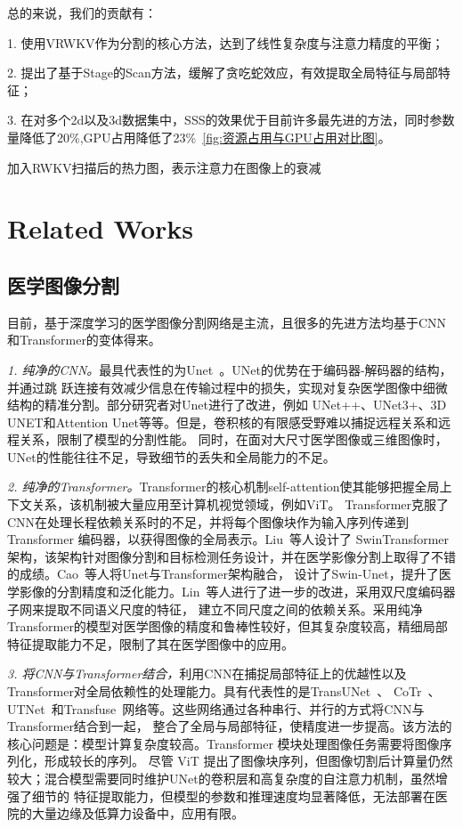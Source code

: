 \documentclass[conference]{IEEEtran}   %
\begin{document}
总的来说，我们的贡献有：

1. 使用VRWKV作为分割的核心方法，达到了线性复杂度与注意力精度的平衡；

2. 提出了基于Stage的Scan方法，缓解了贪吃蛇效应，有效提取全局特征与局部特征；

3. 在对多个2d以及3d数据集中，SSS的效果优于目前许多最先进的方法，同时参数量降低了20\%,GPU占用降低了23\%~\ref{fig:资源占用与GPU占用对比图}。


加入RWKV扫描后的热力图，表示注意力在图像上的衰减



\section{Related Works}
\subsection{医学图像分割}
目前，基于深度学习的医学图像分割网络是主流，且很多的先进方法均基于CNN和Transformer的变体得来。

\textit{1. 纯净的CNN。}最具代表性的为Unet~\cite{Unet}。UNet的优势在于编码器-解码器的结构，并通过跳
跃连接有效减少信息在传输过程中的损失，实现对复杂医学图像中细微结构的精准分割。部分研究者对Unet进行了改进，例如
UNet++、UNet3+、3D UNET和Attention Unet等等。但是，卷积核的有限感受野难以捕捉远程关系和远程关系，限制了模型的分割性能。
同时，在面对大尺寸医学图像或三维图像时，UNet的性能往往不足，导致细节的丢失和全局能力的不足。

\textit{2. 纯净的Transformer。}Transformer的核心机制self-attention使其能够把握全局上下文关系，该机制被大量应用至计算机视觉领域，例如ViT。
Transformer克服了CNN在处理长程依赖关系时的不足，并将每个图像块作为输入序列传递到 Transformer 编码器，以获得图像的全局表示。Liu~\cite{swintransformer}等人设计了
SwinTransformer架构，该架构针对图像分割和目标检测任务设计，并在医学影像分割上取得了不错的成绩。Cao~\cite{swinunet}等人将Unet与Transformer架构融合，
设计了Swin-Unet，提升了医学影像的分割精度和泛化能力。Lin~\cite{dstransunet}等人进行了进一步的改进，采用双尺度编码器子网来提取不同语义尺度的特征，
建立不同尺度之间的依赖关系。采用纯净Transformer的模型对医学图像的精度和鲁棒性较好，但其复杂度较高，精细局部特征提取能力不足，限制了其在医学图像中的应用。


\textit{3. 将CNN与Transformer结合，}利用CNN在捕捉局部特征上的优越性以及Transformer对全局依赖性的处理能力。具有代表性的是TransUNet~\cite{transunet}、
CoTr~\cite{cotr}、UTNet~\cite{utnet}和Transfuse~\cite{transfuse}网络等。这些网络通过各种串行、并行的方式将CNN与Transformer结合到一起，
整合了全局与局部特征，使精度进一步提高。该方法的核心问题是：模型计算复杂度较高。Transformer 模块处理图像任务需要将图像序列化，形成较长的序列。
尽管 ViT 提出了图像块序列，但图像切割后计算量仍然较大；混合模型需要同时维护UNet的卷积层和高复杂度的自注意力机制，虽然增强了细节的
特征提取能力，但模型的参数和推理速度均显著降低，无法部署在医院的大量边缘及低算力设备中，应用有限。
\end{document}
